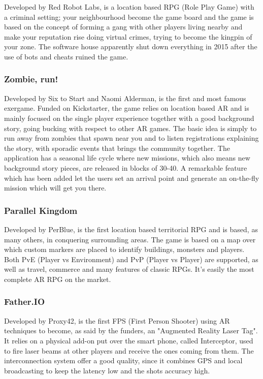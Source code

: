 				Developed by Red Robot Labs, is a location based RPG (Role Play Game) with a criminal setting; your neighbourhood become the game board and the game is based on the concept of forming a gang with other players living nearby and make your reputation rise doing virtual crimes, trying to become the kingpin of your zone.
				The software house apparently shut down everything in 2015 after the use of bots and cheats ruined the game.
			
			\subsubsection{Zombie, run!}
			
				Developed by Six to Start and Naomi Alderman, is the first and most famous exergame. Funded on Kickstarter, the game relies on location based AR and is mainly focused on the single player experience together with a good background story, going bucking with respect to other AR games.
				The basic idea is simply to run away from zombies that spawn near you and to listen registrations explaining the story, with sporadic events that brings the community together.
				The application has a seasonal life cycle where new missions, which also means new background story pieces, are released in blocks of 30-40.
				A remarkable feature which has been added let the users set an arrival point and generate an on-the-fly mission which will get you there.
			
			\subsubsection{Parallel Kingdom}
			
				Developed by PerBlue, is the first location based territorial RPG and is based, as many others, in conquering surrounding areas.
				The game is based on a map over which custom markers are placed to identify buildings, monsters and players.
				Both PvE (Player vs Environment) and PvP (Player vs Player) are supported, as well as travel, commerce and many features of classic RPGs.
				It's easily the most complete AR RPG on the market.
			
			\subsubsection{Father.IO}
			
				Developed by Proxy42, is the first FPS (First Person Shooter) using AR techniques to become, as said by the funders, an "Augmented Reality Laser Tag".
				It relies on a physical add-on put over the smart phone, called Interceptor, used to fire laser beams at other players and receive the ones coming from them.
				The interconnection system offer a good quality, since it combines GPS and local broadcasting to keep the latency low and the shots accuracy high.
				
